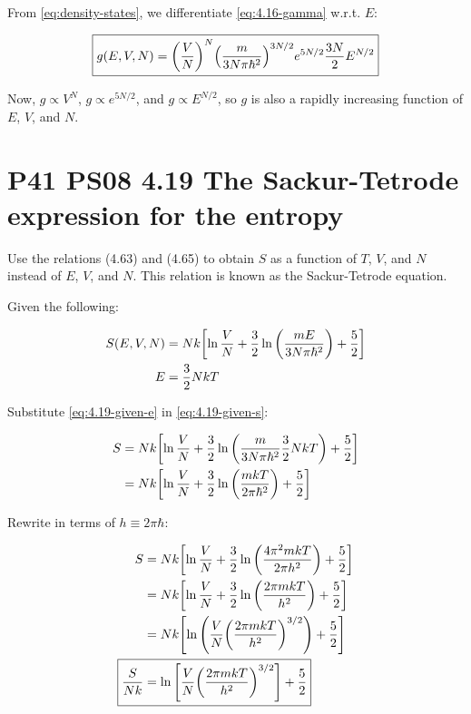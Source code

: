 \documentclass[9pt,a4paper,twocolumn]{article}
\begin{document}
From \eqref{eq:density-states}, we differentiate \eqref{eq:4.16-gamma} w.r.t. $E$:

\begin{equation}
	\boxed{
		g(E,V,N) = \qty(\frac{V}{N})^N \qty(\frac{m}{3N\pi\hbar^2})^{3N/2} e^{5N/2} \frac{3N}{2} E^{N/2}
	} \label{eq:4.16-answer}
\end{equation}

Now, $g \propto V^N$, $g \propto e^{5N/2}$, and $g \propto E^{N/2}$, so $g$ is also a rapidly increasing function of $E$, $V$, and $N$.

\section{P41 PS08 4.19 The Sackur-Tetrode expression for the entropy}
Use the relations (4.63) and (4.65) to obtain $S$ as a function of $T$, $V$, and $N$ instead of $E$, $V$, and $N$. This relation is known as the Sackur-Tetrode equation.

Given the following:

\begin{align}
	S(E,V,N) &= Nk\qty[\ln\frac{V}{N} + \frac{3}{2}\ln\qty(\frac{mE}{3N\pi\hbar^2}) + \frac{5}{2}] \label{eq:4.19-given-s} \\
	E &= \frac{3}{2}NkT \label{eq:4.19-given-e}
\end{align}

Substitute \eqref{eq:4.19-given-e} in \eqref{eq:4.19-given-s}:

\begin{align}
	S &= Nk\qty[\ln\frac{V}{N} + \frac{3}{2}\ln\qty(\frac{m}{3N\pi\hbar^2} \frac{3}{2}NkT) + \frac{5}{2}] \\
	&= Nk\qty[\ln\frac{V}{N} + \frac{3}{2}\ln\qty(\frac{mkT}{2\pi\hbar^2}) + \frac{5}{2}]
\end{align}

Rewrite in terms of $h \equiv 2\pi\hbar$:

\begin{align}
	S &= Nk\qty[\ln\frac{V}{N} + \frac{3}{2}\ln\qty(\frac{4\pi^2 mkT}{2\pi h^2}) + \frac{5}{2}] \\
	&= Nk\qty[\ln\frac{V}{N} + \frac{3}{2}\ln\qty(\frac{2\pi mkT}{h^2}) + \frac{5}{2}] \\
	&= Nk\qty[\ln\qty(\frac{V}{N}\qty(\frac{2\pi mkT}{h^2})^{3/2}) + \frac{5}{2}] \\
	\Aboxed{
		\frac{S}{Nk} &= \ln\qty[\frac{V}{N}\qty(\frac{2\pi mkT}{h^2})^{3/2}] + \frac{5}{2}
	}
\end{align}
\end{document}
